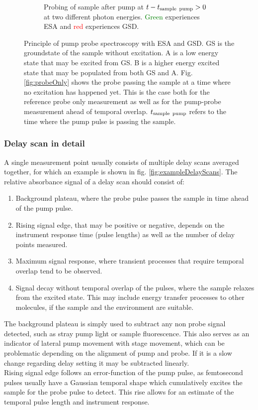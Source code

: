 \documentclass[twoside,openright,listof=numbered]{scrreprt}
\begin{document}
\begin{figure}[hbtp]
\begin{subfigure}[t]{0.3\textwidth}
\caption{Probing of sample  after pump at $t-t_\text{sample\, pump} > 0$ at two different photon energies. \textcolor{green}{Green} experiences ESA and \textcolor{red}{red} experiences GSD.\label{fig:probeAfterPump}}
\end{subfigure}
\caption[Principle of pump probe spectroscopy with excited states absorption and ground state depletion.]{Principle of pump probe spectroscopy with ESA and GSD. GS is the groundstate of the sample without excitation. A is a low energy state that may be excited from GS. B is a higher energy excited state that may be populated from both GS and A. Fig. \ref{fig:probeOnly} shows the probe passing the sample at a time where no excitation has happened yet. This is the case both for the reference probe only measurement as well as for the pump-probe measurement ahead of temporal overlap. $t_\text{sample\, pump}$ refers to the time where the pump pulse is passing the sample.\label{fig:CompendiumTA}}
\end{figure}

\subsubsection{Delay scan in detail}
A single measurement point usually consists of multiple delay scans averaged together, for which an example is shown in fig. \ref{fig:exampleDelayScans}. The relative absorbance signal of a delay scan should consist of:
\begin{enumerate}
\item Background plateau, where the probe pulse passes the sample in time ahead of the pump pulse.
\item Rising signal edge, that may be positive or negative, depends on the instrument response time (pulse lengths) as well as the number of delay points measured.
\item Maximum signal response, where transient processes that require temporal overlap tend to be observed.
\item Signal decay without temporal overlap of the pulses, where the sample relaxes from the excited state. This may include energy transfer processes to other molecules, if the sample and the environment are suitable.
\end{enumerate}
The background plateau is simply used to subtract any non probe signal detected, such as stray pump light or sample fluorescence. This also serves as an indicator of lateral pump movement with stage movement, which can be problematic depending on the alignment of pump and probe. If it is a slow change regarding delay setting it may be subtracted linearly.\\
Rising signal edge follows an error-function of the pump pulse, as femtosecond pulses usually have a Gaussian temporal shape which cumulatively excites the sample for the probe pulse to detect. This rise allows for an estimate of the temporal pulse length and instrument response.
\end{document}
